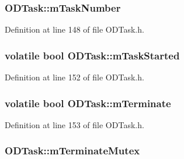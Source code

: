 \subsubsection[{\texorpdfstring{m\+Task\+Number}{mTaskNumber}}]{ O\+D\+Task\+::m\+Task\+Number\hspace{0.3cm}{\ttfamily [protected]}}\hypertarget{class_o_d_task_aac8bea3092cb5afa53b6f529b54afb26}{}\label{class_o_d_task_aac8bea3092cb5afa53b6f529b54afb26}


Definition at line 148 of file O\+D\+Task.\+h.

\subsubsection[{\texorpdfstring{m\+Task\+Started}{mTaskStarted}}]{\setlength{\rightskip}{0pt plus 5cm}volatile {\bf bool} O\+D\+Task\+::m\+Task\+Started\hspace{0.3cm}{\ttfamily [protected]}}\hypertarget{class_o_d_task_a0f4099666c884667eebb9433bcc3d6c7}{}\label{class_o_d_task_a0f4099666c884667eebb9433bcc3d6c7}


Definition at line 152 of file O\+D\+Task.\+h.

\subsubsection[{\texorpdfstring{m\+Terminate}{mTerminate}}]{\setlength{\rightskip}{0pt plus 5cm}volatile {\bf bool} O\+D\+Task\+::m\+Terminate\hspace{0.3cm}{\ttfamily [protected]}}\hypertarget{class_o_d_task_a38dd3cdea39254e59c505f5bfc9127e5}{}\label{class_o_d_task_a38dd3cdea39254e59c505f5bfc9127e5}


Definition at line 153 of file O\+D\+Task.\+h.

\subsubsection[{\texorpdfstring{m\+Terminate\+Mutex}{mTerminateMutex}}]{ O\+D\+Task\+::m\+Terminate\+Mutex\hspace{0.3cm}{\ttfamily [protected]}}\hypertarget{class_o_d_task_aa534f7033d7c3fc06a55f24aac50482a}{}\label{class_o_d_task_aa534f7033d7c3fc06a55f24aac50482a}


